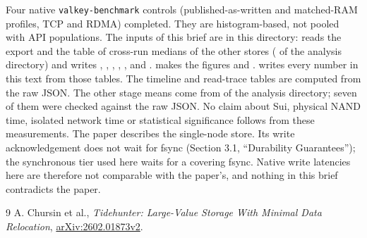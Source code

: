 \documentclass[10pt,a4paper]{article}
\begin{document}
Four native \texttt{valkey-benchmark} controls (published-as-written and matched-RAM profiles, TCP and RDMA) completed. They are histogram-based, not pooled with API populations. The inputs of this brief are in this directory:  reads the export and the table of cross-run medians of the other stores ( of the analysis directory) and writes , , , , ,  and .  makes the figures and .  writes every number in this text from those tables. The timeline and read-trace tables are computed from the raw JSON. The other stage means come from  of the analysis directory; seven of them were checked against the raw JSON. No claim about Sui, physical NAND time, isolated network time or statistical significance follows from these measurements. The paper \cite{tidehunter} describes the single-node store. Its write acknowledgement does not wait for fsync (Section 3.1, ``Durability Guarantees''); the synchronous tier used here waits for a covering fsync. Native write latencies here are therefore not comparable with the paper's, and nothing in this brief contradicts the paper.

\begin{thebibliography}{9}\small
{} A. Chursin et al., \emph{Tidehunter: Large-Value Storage With Minimal Data Relocation}, \href{https://arxiv.org/abs/2602.01873v2}{arXiv:2602.01873v2}.
\end{thebibliography}
\clearpage

\end{document}
